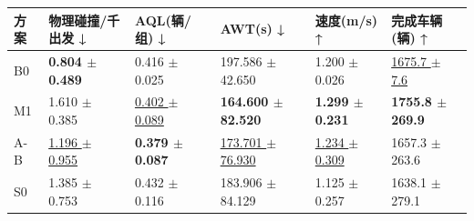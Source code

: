 \begin{tabular}{llllll}
\toprule
方案 & 物理碰撞/千出发 ↓ & AQL(辆/组) ↓ & AWT(s) ↓ & 速度(m/s) ↑ & 完成车辆(辆) ↑ \\
\midrule
B0 & \textbf{0.804 $\pm$ 0.489} & 0.416 $\pm$ 0.025 & 197.586 $\pm$ 42.650 & 1.200 $\pm$ 0.026 & \underline{1675.7 $\pm$ 7.6} \\
M1 & 1.610 $\pm$ 0.385 & \underline{0.402 $\pm$ 0.089} & \textbf{164.600 $\pm$ 82.520} & \textbf{1.299 $\pm$ 0.231} & \textbf{1755.8 $\pm$ 269.9} \\
A-B & \underline{1.196 $\pm$ 0.955} & \textbf{0.379 $\pm$ 0.087} & \underline{173.701 $\pm$ 76.930} & \underline{1.234 $\pm$ 0.309} & 1657.3 $\pm$ 263.6 \\
S0 & 1.385 $\pm$ 0.753 & 0.432 $\pm$ 0.116 & 183.906 $\pm$ 84.129 & 1.125 $\pm$ 0.257 & 1638.1 $\pm$ 279.1 \\
\bottomrule
\end{tabular}